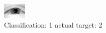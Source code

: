 \begin{figure}[h!]
\begin{center}
\includegraphics[width=0.60\columnwidth]{figures/ID2304_class_1_target_2.png}
\end{center}
\caption{ Classification: 1 actual target: 2}
\label{fig:ID2304_class_1_target_2}
\end{figure}
